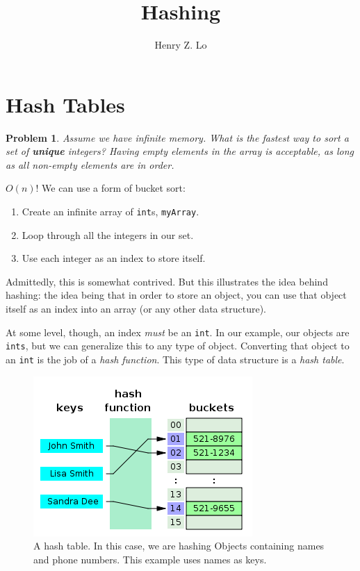 \documentclass{article}
\newtheorem{problem}{Problem}
\begin{document}
\title{Hashing}
\author{Henry Z. Lo}
\maketitle

\section{Hash Tables}

\begin{problem}
Assume we have infinite memory.  What is the fastest way to sort a set of \textbf{unique} integers?  Having empty elements in the array is acceptable, as long as all non-empty elements are in order.
\end{problem}

$O(n)$!  We can use a form of bucket sort:

\begin{enumerate}
\item Create an infinite array of \verb|int|s, \verb|myArray|.
\item Loop through all the integers in our set.
\item Use each integer as an index to store itself.
\end{enumerate}

Admittedly, this is somewhat contrived.  But this illustrates the idea behind hashing: the idea being that in order to store an object, you can use that object itself as an index into an array (or any other data structure).

At some level, though, an index \textit{must} be an \verb|int|.  In our example, our objects are \verb|ints|, but we can generalize this to any type of object.  Converting that object to an \verb|int| is the job of a \textit{hash function}.  This type of data structure is a \textit{hash table}.

\begin{figure}
\centering
\includegraphics[scale=0.6]{img/hashtable.png}
\caption{A hash table.  In this case, we are hashing Objects containing names and phone numbers.  This example uses names as keys.}
\end{figure}
\end{document}
